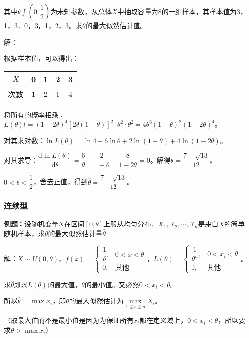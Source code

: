 \documentclass[UTF8, 12pt]{ctexart}
\begin{document}
其中$\theta\int\left(0,\dfrac{1}{2}\right)$为未知参数，从总体$X$中抽取容量为8的一组样本，其样本值为3，1，3，0，3，1，2，3。求$\theta$的最大似然估计值。

解：

根据样本值，可以得出：\medskip

\begin{tabular}{c|cccc}
    \hline
    $X$ & 0 & 1 & 2 & 3 \\ \hline
    次数 & 1 & 2 & 1 & 4 \\ \hline
\end{tabular} \medskip

将所有的概率相乘：$L(\theta)l=(1-2\theta)^4[2\theta(1-\theta)]^2\cdot\theta^2\cdot\theta^2=4\theta^6(1-\theta)^2(1-2\theta)^4$。

对其求对数：$\ln L(\theta)=\ln4+6\ln\theta+2\ln(1-\theta)+4\ln(1-2\theta)$。

对其求导：$\dfrac{\textrm{d}\ln L(\theta)}{\textrm{d}\theta}=\dfrac{6}{\theta}-\dfrac{2}{1-\theta}-\dfrac{8}{1-2\theta}=0$。解得$\theta=\dfrac{7\pm\sqrt{13}}{12}$。

$0<\theta<\dfrac{1}{2}$，舍去正值，得到$\hat{\theta}=\dfrac{7-\sqrt{13}}{12}$。

\subsubsection{连续型}

\textbf{例题：}设随机变量$X$在区间$[0,\theta]$上服从均匀分布，$X_1,X_2,\cdots,X_n$是来自$X$的简单随机样本，求$\theta$的最大似然估计量$\hat{\theta}$

解：$X\sim U(0,\theta)$，$f(x)=\left\{\begin{array}{ll}
    \dfrac{1}{\theta}, & 0<x<\theta \\
    0, & \text{其他}
\end{array}\right.$，$L(\theta)=\left\{\begin{array}{ll}
    \dfrac{1}{\theta^n}, & 0<x_i<\theta \\
    0, & \text{其他}
\end{array}\right.$。

求$\hat{\theta}$即求$L(\theta)$的最大值，$\theta$的最小值。又必然$0<x_i<\theta$。

所以$\hat{\theta}=\max x_i$，即$\theta$的最大似然估计为$\max\limits_{1\leqslant i\leqslant n}X_i$。

（取最大值而不是最小值是因为为保证所有$x_i$都在定义域上，$0<x_i<\theta$，所以要求$\theta>\max x_i$）
\end{document}
